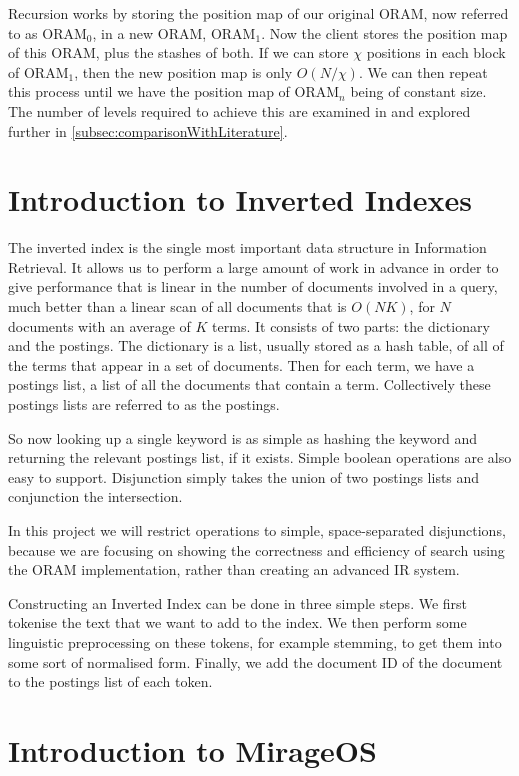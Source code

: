 \documentclass[12pt,a4paper,twoside,openright]{report}
\begin{document}
Recursion works by storing the position map of our original ORAM, now referred to as ORAM$_0$, in a new ORAM, ORAM$_1$. Now the client stores the position map of this ORAM, plus the stashes of both. If we can store $\chi$ positions in each block of ORAM$_1$, then the new position map is only $O(N/\chi)$. We can then repeat this process until we have the position map of ORAM$_n$ being of constant size. The number of levels required to achieve this are examined in \cite{stefanov2013path} and explored further in \cref{subsec:comparisonWithLiterature}.

\section{Introduction to Inverted Indexes}
\label{sec:invertedindexintro}

The inverted index is the single most important data structure in Information Retrieval. It allows us to perform a large amount of work in advance in order to give performance that is linear in the number of documents involved in a query, much better than a linear scan of all documents that is $O(NK)$, for $N$ documents with an average of $K$ terms. It consists of two parts: the dictionary and the postings. The dictionary is a list, usually stored as a hash table, of all of the terms that appear in a set of documents. Then for each term, we have a postings list, a list of all the documents that contain a term. Collectively these postings lists are referred to as the postings.

So now looking up a single keyword is as simple as hashing the keyword and returning the relevant postings list, if it exists. Simple boolean operations are also easy to support. Disjunction simply takes the union of two postings lists and conjunction the intersection.

In this project we will restrict operations to simple, space-separated disjunctions, because we are focusing on showing the correctness and efficiency of search using the ORAM implementation, rather than creating an advanced IR system.

Constructing an Inverted Index can be done in three simple steps. We first tokenise the text that we want to add to the index. We then perform some linguistic preprocessing on these tokens, for example stemming, to get them into some sort of normalised form. Finally, we add the document ID of the document to the postings list of each token.

\section{Introduction to MirageOS}
\end{document}
